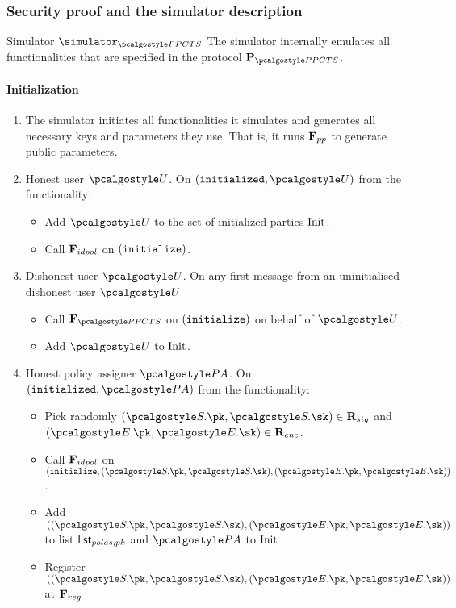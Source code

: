 \documentclass[runningheads,10pt]{llncs}
\numberwithin{equation}{section}
\begin{document}
\subsubsection{Security proof and the simulator description}
\begin{simbox}{Simulator $\simulator_{\PPCTS}$} The simulator internally emulates all 
  functionalities that are specified in the protocol $\prot{\PPCTS}$.
  
  \paragraph{Initialization}
  \begin{enumerate}
    \item The simulator initiates all functionalities it simulates and generates all
     necessary keys and parameters they use. That is, it runs $\mathbf{F}_{{pp}}$ to generate
     public parameters.
  \item Honest user $\user$. On $(\initialized, \user)$ from the functionality:
    \begin{itemize}
    \item  Add $\user$ to the set of initialized parties
      $\mathrm{Init}$.
  \item Call $\mathbf{F}_{{idpol}}$ on $(\mathtt{initialize})$. 
    \end{itemize}
  \item Dishonest user $\user$. On any first message from an uninitialised dishonest user
    $\user$
    \begin{itemize}
    \item Call $\func{\PPCTS}$ on $(\mathtt{initialize})$ on behalf of $\user$.
    \item Add $\user$ to $\mathrm{Init}$.
    \end{itemize}

  \item Honest policy assigner $\polas$. On $(\initialized, \polas)$ from the functionality:
    \begin{itemize}
    \item Pick randomly $(\SIG.\pk, \SIG.\sk) \in \REL_{sig}$ and $(\ENC.\pk,
      \ENC.\sk) \in \REL_{enc}$.
    \item Call $\mathbf{F}_{{idpol}}$ on $(\initialize, (\SIG.\pk, \SIG.\sk), (\ENC.\pk, \ENC.\sk))$.
    \item Add $((\SIG.\pk, \SIG.\sk), (\ENC.\pk, \ENC.\sk))$ to list ${\mathsf{list}_{polas, pk}}$ and $
      \polas$ to $\mathrm{Init}$
    \item Register $((\SIG.\pk, \SIG.\sk), (\ENC.\pk, \ENC.\sk))$ at $\mathbf{F}_{{reg}}$ 
    \end{itemize}


\end{enumerate}
\end{simbox}
\end{document}
